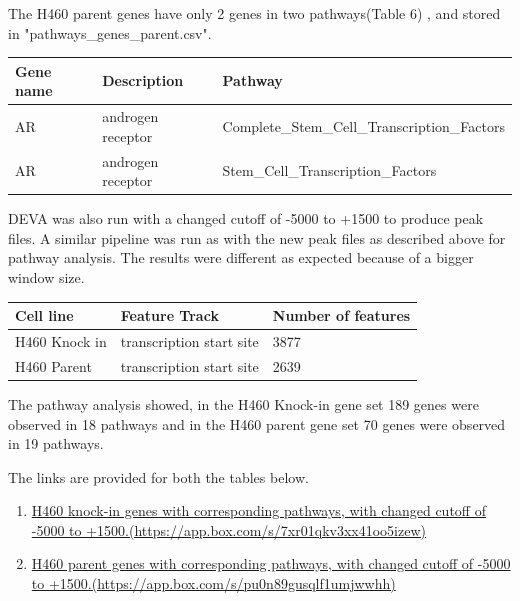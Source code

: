 \documentclass[11pt]{article}
\begin{document}
The H460 parent genes have only 2 genes in two pathways(Table 6) , and stored in "pathways\_genes\_parent.csv".

\begin{table}[H]
    \begin{tabular}{|l|l|l|}
    \hline
    {\bf Gene name} & {\bf Description}       & {\bf Pathway}                                  \\ \hline
    AR   & androgen receptor & Complete\_Stem\_Cell\_Transcription\_Factors \\ 
    AR   & androgen receptor & Stem\_Cell\_Transcription\_Factors       \\ \hline
    \end{tabular}
\end{table}



DEVA was also run with a changed cutoff of -5000 to +1500 to produce peak files. A similar pipeline was run as with the new peak files as described above for pathway analysis. The results were different as expected because of a bigger window size. 

\begin{table}[H]
\centering
	\begin{tabular}{|l|l|l|}
	\hline
		Cell line & Feature Track & Number of features \\ \hline
		H460 Knock in & transcription start site & 3877 \\ \hline
		H460 Parent & transcription start site & 2639 \\ \hline
	\end{tabular}
\end{table}

The pathway analysis showed, in the H460 Knock-in gene set 189 genes were observed in 18 pathways and in the H460 parent gene set 70 genes were observed in 19 pathways. 

The links are provided for both the tables below. 
\begin{enumerate}

	\item \href{https://app.box.com/s/7xr01qkv3xx41oo5izew}{H460 knock-in genes with corresponding pathways, with changed cutoff of -5000 to +1500.(https://app.box.com/s/7xr01qkv3xx41oo5izew)} 
%	
	\item \href{https://app.box.com/s/pu0n89gusqlf1umjwwhh}{H460 parent genes with corresponding pathways,  with changed cutoff of -5000 to +1500.(https://app.box.com/s/pu0n89gusqlf1umjwwhh)}
\end{enumerate}
\end{document}
